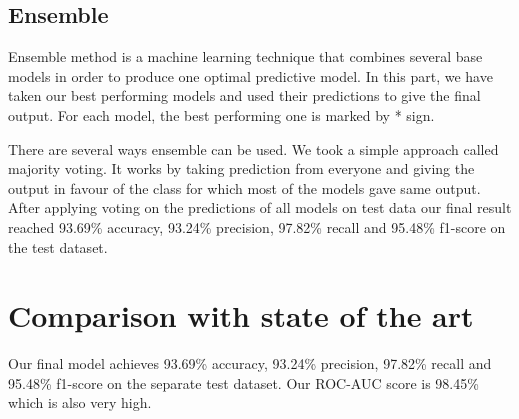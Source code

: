 \documentclass[14pt, conference]{IEEEtran}
\begin{document}
\subsection{Ensemble \label{ensemble}}
Ensemble method is a machine learning technique that combines several base models in order to produce one optimal predictive model. In this part, we have taken our best performing models and used their predictions to give the final output. For each model, the best performing one is marked by * sign.


There are several ways ensemble can be used. We took a simple approach called majority voting. It works by taking prediction from everyone and giving the output in favour of the class for which most of the models gave same output. After applying voting on the predictions of all models on test data our final result reached 93.69\% accuracy, 93.24\% precision, 97.82\% recall and 95.48\% f1-score on the test dataset. 

\section{Comparison with state of the art \label{comparison}}
Our final model achieves 93.69\% accuracy, 93.24\% precision, 97.82\% recall and 95.48\% f1-score on the separate test dataset. Our ROC-AUC score is 98.45\% which is also very high.\\
\end{document}
